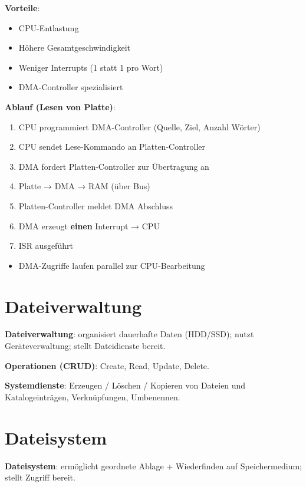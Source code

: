 \documentclass[11pt, a4paper]{article}
\begin{document}
\textbf{Vorteile}:

\begin{itemize}
  \item CPU-Entlastung
  \item Höhere Gesamtgeschwindigkeit
  \item Weniger Interrupts (1 statt 1 pro Wort)
  \item DMA-Controller spezialisiert
\end{itemize}

\textbf{Ablauf (Lesen von Platte)}:

\begin{enumerate}
  \item CPU programmiert DMA-Controller (Quelle, Ziel, Anzahl Wörter)
  \item CPU sendet Lese-Kommando an Platten-Controller
  \item DMA fordert Platten-Controller zur Übertragung an
  \item Platte → DMA → RAM (über Bus)
  \item Platten-Controller meldet DMA Abschluss
  \item DMA erzeugt \textbf{einen} Interrupt → CPU
  \item ISR ausgeführt
\end{enumerate}

\begin{itemize}
  \item DMA-Zugriffe laufen parallel zur CPU-Bearbeitung
\end{itemize}


\section{Dateiverwaltung}

\textbf{Dateiverwaltung}: organisiert dauerhafte Daten (HDD/SSD); nutzt Geräteverwaltung; stellt Dateidienste bereit.


\textbf{Operationen (CRUD)}: Create, Read, Update, Delete.


\textbf{Systemdienste}: Erzeugen / Löschen / Kopieren von Dateien und Katalogeinträgen, Verknüpfungen, Umbenennen.



\section{Dateisystem}

\textbf{Dateisystem}: ermöglicht geordnete Ablage + Wiederfinden auf Speichermedium; stellt Zugriff bereit.
\end{document}
